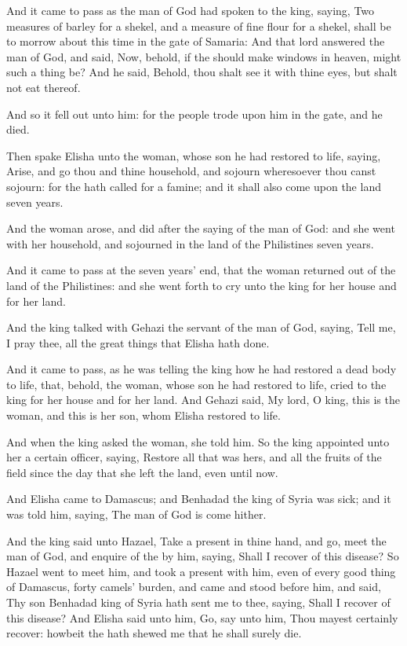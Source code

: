\Verse And it came to pass as the man of God had spoken to the king, saying, Two measures of barley for a shekel, and a measure of fine flour for a shekel, shall be to morrow about this time in the gate of Samaria: \Verse And that lord answered the man of God, and said, Now, behold, if the \LORD should make windows in heaven, might such a thing be? And he said, Behold, thou shalt see it with thine eyes, but shalt not eat thereof.

\Verse And so it fell out unto him: for the people trode upon him in the gate, and he died.


\Chapter
\Verse Then spake Elisha unto the woman, whose son he had restored to life, saying, Arise, and go thou and thine household, and sojourn wheresoever thou canst sojourn: for the \LORD hath called for a famine; and it shall also come upon the land seven years.

\Verse And the woman arose, and did after the saying of the man of God: and she went with her household, and sojourned in the land of the Philistines seven years.

\Verse And it came to pass at the seven years' end, that the woman returned out of the land of the Philistines: and she went forth to cry unto the king for her house and for her land.

\Verse And the king talked with Gehazi the servant of the man of God, saying, Tell me, I pray thee, all the great things that Elisha hath done.

\Verse And it came to pass, as he was telling the king how he had restored a dead body to life, that, behold, the woman, whose son he had restored to life, cried to the king for her house and for her land. And Gehazi said, My lord, O king, this is the woman, and this is her son, whom Elisha restored to life.

\Verse And when the king asked the woman, she told him. So the king appointed unto her a certain officer, saying, Restore all that was hers, and all the fruits of the field since the day that she left the land, even until now.

\Verse And Elisha came to Damascus; and Benhadad the king of Syria was sick; and it was told him, saying, The man of God is come hither.

\Verse And the king said unto Hazael, Take a present in thine hand, and go, meet the man of God, and enquire of the \LORD by him, saying, Shall I recover of this disease?  \Verse So Hazael went to meet him, and took a present with him, even of every good thing of Damascus, forty camels' burden, and came and stood before him, and said, Thy son Benhadad king of Syria hath sent me to thee, saying, Shall I recover of this disease?  \Verse And Elisha said unto him, Go, say unto him, Thou mayest certainly recover: howbeit the \LORD hath shewed me that he shall surely die.

